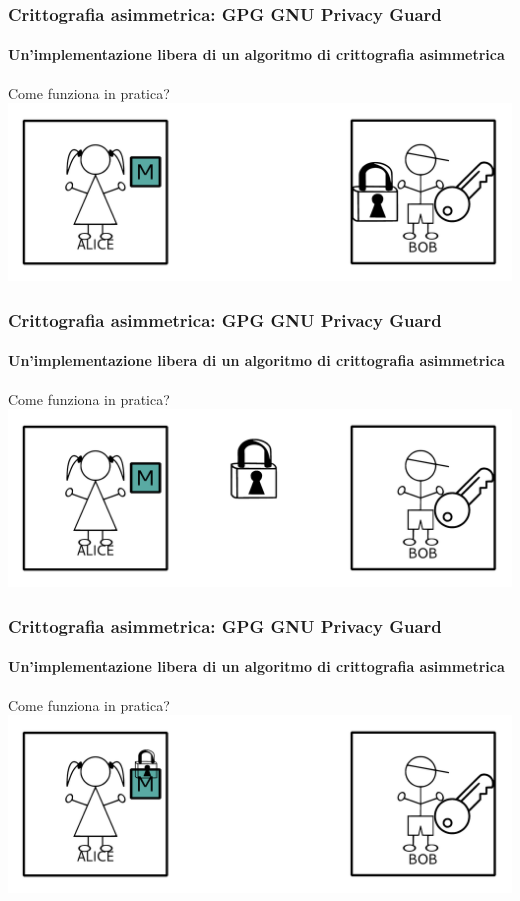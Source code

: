 \documentclass{beamer}
\begin{document}
\begin{frame}
  \frametitle{Crittografia asimmetrica: GPG GNU Privacy Guard}
  \framesubtitle{Un'implementazione libera di un algoritmo di crittografia asimmetrica}

  \begin{block}{Come funziona in pratica?}
    \centering
    \includegraphics[width=.9\linewidth]{img/ab1.pdf}
  \end{block}
\end{frame}

\begin{frame}
  \frametitle{Crittografia asimmetrica: GPG GNU Privacy Guard}
  \framesubtitle{Un'implementazione libera di un algoritmo di crittografia asimmetrica}

  \begin{block}{Come funziona in pratica?}
    \centering
    \includegraphics[width=.9\linewidth]{img/ab2.pdf}
  \end{block}
\end{frame}

\begin{frame}
  \frametitle{Crittografia asimmetrica: GPG GNU Privacy Guard}
  \framesubtitle{Un'implementazione libera di un algoritmo di crittografia asimmetrica}

  \begin{block}{Come funziona in pratica?}
    \centering
    \includegraphics[width=.9\linewidth]{img/ab3.pdf}
  \end{block}
\end{frame}
\end{document}
